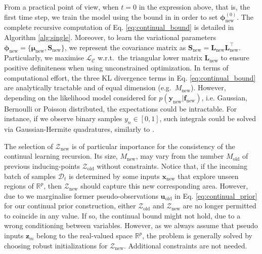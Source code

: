 \documentclass[]{article}
\def\S{{\mathbf S}}
\def\L{{\mathbf L}}
\def\u{{\mathbf u}}
\def\f{{\mathbf f}}
\newcommand{\uold}{{\u_{\text{old}}}}
\newcommand{\fnew}{{\f_{\text{new}}}}
\newcommand{\Zcal}{\mathcal{Z}}
\newcommand{\Dcal}{\mathcal{D}}
\newcommand{\Lcal}{\mathcal{L}}
\newcommand{\xc}{\bm{x}}
\newcommand{\yc}{\bm{y}}
\newcommand{\zc}{\bm{z}}
\newcommand{\ycnew}{{\yc_{\text{new}}}}
\newcommand{\phinew}{{\bm{\phi}_{\text{new}}}}
\begin{document}
From a practical point of view, when $t=0$ in the expression above, that is, the first time step, we train the model using the bound in \citet{hensman2015scalable} in order to set $\bm{\phi}^{(0)}_\text{new}$. The complete recursive computation of Eq. \eqref{eq:continual_bound} is detailed in Algorithm \ref{alg:single}. Moreover, to learn the variational parameters $\phinew = \{\bm{\mu}_\text{new}, \S_\text{new}\}$, we represent the covariance matrix as $\S_\text{new} = \L_\text{new}\L_\text{new}^\top$. Particularly, we maximise $\Lcal_{\mathcal{C}}$ w.r.t.\ the triangular lower matrix $\L_\text{new}$ to ensure positive definiteness when using unconstrained optimization. In terms of computational effort, the three KL divergence terms in Eq. \eqref{eq:continual_bound} are analytically tractable and of equal dimension (e.g.\ $M_{\text{new}}$). However, depending on the likelihood model considered for $p(\ycnew|\fnew)$, i.e. Gaussian, Bernoulli or Poisson distributed, the expectations could be intractable. For instance, if we observe binary samples $y_n \in [0,1]$, such integrals could be solved via Gaussian-Hermite quadratures, similarly to \citet{hensman2015scalable,saul2016chained}.

The selection of $\Zcal_\text{new}$ is of particular importance for the consistency of the continual learning recursion. Its size, $M_\text{new}$, may vary from the number $M_{\text{old}}$ of previous inducing-points $\Zcal_\text{old}$ without constraints. Notice that, if the incoming batch of samples $\Dcal_{t}$ is determined by some inputs $\xc_{\text{new}}$ that explore unseen regions of $\mathbb{R}^p$, then $\Zcal_\text{new}$ should capture this new corresponding area. However, due to we marginalise former pseudo-observations $\uold$ in Eq. \eqref{eq:continual_prior} for our continual prior construction, either $\Zcal_\text{old}$ and $\Zcal_\text{new}$ are no longer permitted to coincide in any value. If so, the continual bound might not hold, due to a wrong conditioning between variables. However, as we always assume that pseudo inputs $\zc_m$ belong to the real-valued space $\mathbb{R}^{p}$, the problem is generally solved by choosing robust initializations for $\Zcal_\text{new}$. Additional constraints are not needed. 
\end{document}
